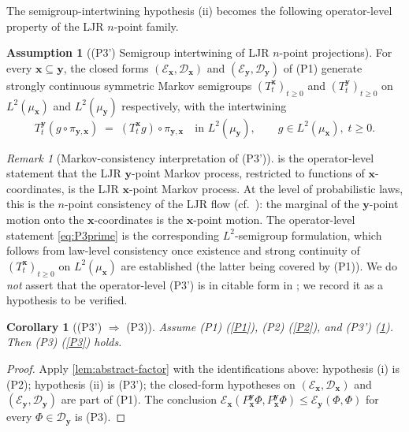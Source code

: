 \documentclass[11pt,reqno]{amsart}
\theoremstyle{plain}
\newtheorem{corollary}[theorem]{Corollary}
\theoremstyle{definition}
\newtheorem{assumption}[theorem]{Assumption}
\theoremstyle{remark}
\newtheorem{remark}[theorem]{Remark}
\newcommand{\cD}{\mathcal D}
\newcommand{\cE}{\mathcal E}
\begin{document}
The semigroup-intertwining hypothesis (ii) becomes the following
operator-level property of the LJR $n$-point family.

\begin{assumption}[(P3') Semigroup intertwining of LJR $n$-point
projections]\label{P3prime}
For every $\mathbf x\subseteq\mathbf y$, the closed forms
$(\cE_{\mathbf x},\cD_{\mathbf x})$ and
$(\cE_{\mathbf y},\cD_{\mathbf y})$ of (P1) generate strongly
continuous symmetric Markov semigroups
$(T_{t}^{\mathbf x})_{t\ge 0}$ and $(T_{t}^{\mathbf y})_{t\ge 0}$
on $L^{2}(\mu_{\mathbf x})$ and $L^{2}(\mu_{\mathbf y})$
respectively, with the intertwining
\begin{equation}\label{eq:P3prime}
  T_{t}^{\mathbf y}(g\circ\pi_{\mathbf y,\mathbf x})
  \;=\;(T_{t}^{\mathbf x}g)\circ\pi_{\mathbf y,\mathbf x}
  \quad\text{in }L^{2}(\mu_{\mathbf y}),
  \qquad g\in L^{2}(\mu_{\mathbf x}),\;t\ge 0.
\end{equation}
\end{assumption}

\begin{remark}[Markov-consistency interpretation of (P3')]\label{rem:P3prime-Markov}
 is the operator-level statement that the LJR
$\mathbf y$-point Markov process, restricted to functions of
$\mathbf x$-coordinates, is the LJR $\mathbf x$-point Markov
process. At the level of probabilistic laws, this is the
$n$-point consistency of the LJR flow
(cf.~\cite[\S 3]{LeJanRaimond2004}): the marginal of the
$\mathbf y$-point motion onto the $\mathbf x$-coordinates is the
$\mathbf x$-point motion. The operator-level statement
\eqref{eq:P3prime} is the corresponding $L^{2}$-semigroup
formulation, which follows from law-level consistency once
existence and strong continuity of $(T_{t}^{\mathbf x})_{t\ge 0}$
on $L^{2}(\mu_{\mathbf x})$ are established (the latter being
covered by (P1)). We do \emph{not} assert that the operator-level
(P3') is in citable form in \cite{LeJanRaimond2004}; we record it
as a hypothesis to be verified.
\end{remark}

\begin{corollary}[(P3') $\Longrightarrow$ (P3)]\label{cor:P3prime-implies-P3}
Assume (P1) (\cref{P1}), (P2) (\cref{P2}), and (P3')
(\cref{P3prime}). Then (P3) (\cref{P3}) holds.
\end{corollary}

\begin{proof}
Apply \cref{lem:abstract-factor} with the identifications above:
hypothesis (i) is (P2); hypothesis (ii) is (P3'); the closed-form
hypotheses on $(\cE_{\mathbf x},\cD_{\mathbf x})$ and
$(\cE_{\mathbf y},\cD_{\mathbf y})$ are part of (P1). The
conclusion
$\cE_{\mathbf x}(P_{\mathbf x}^{\mathbf y}\Phi,P_{\mathbf x}^{\mathbf y}\Phi)
\le\cE_{\mathbf y}(\Phi,\Phi)$ for every $\Phi\in\cD_{\mathbf y}$
is (P3).
\end{proof}
\end{document}
